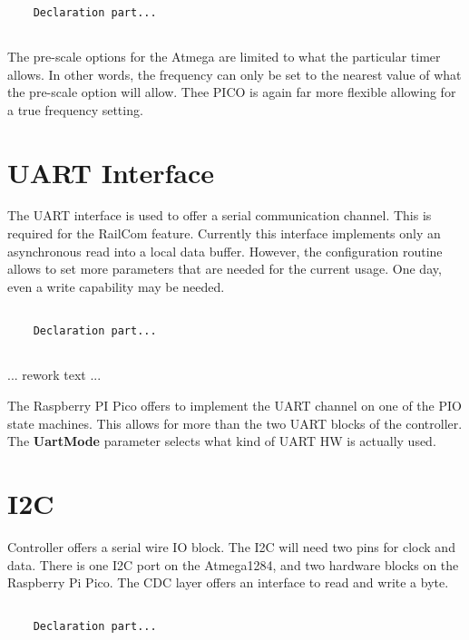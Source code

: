 \lstset{language=c++, style=codesnippetstyle}
\begin{lstlisting}
   
    Declaration part...
    
\end{lstlisting}
\FloatBarrier

The pre-scale options for the Atmega are limited to what the particular timer allows. In other words, the frequency can only be set to the nearest value of what the pre-scale option will allow. Thee PICO is again far more flexible allowing for a true frequency setting.

\section{UART Interface}

The UART interface is used to offer a serial communication channel. This is required for the RailCom feature. Currently this interface implements only an asynchronous read into a local data buffer. However, the configuration routine allows to set more parameters that are needed for the current usage. One day, even a write capability may be needed.

\lstset{language=c++, style=codesnippetstyle}
\begin{lstlisting}
   
    Declaration part...
    
\end{lstlisting}
\FloatBarrier

... rework text ... 

The Raspberry PI Pico offers to implement the UART channel on one of the PIO state machines. This allows for more than the two UART blocks of the controller. The \textbf{UartMode} parameter selects what kind of UART HW is actually used.

\section{I2C}

Controller offers a serial wire IO block. The I2C will need two pins for clock and data. There is one I2C port on the Atmega1284, and two hardware blocks on the Raspberry Pi Pico. The CDC layer offers an interface to read and write a byte.

\lstset{language=c++, style=codesnippetstyle}
\begin{lstlisting}
   
    Declaration part...
    
\end{lstlisting}
\FloatBarrier

